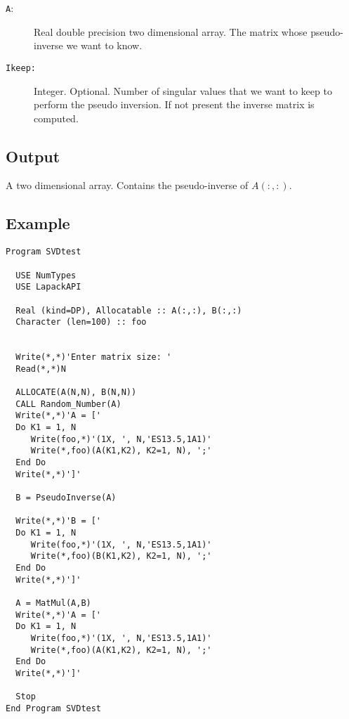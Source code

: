 \begin{description}
\item[\texttt{A}:]  Real double precision two dimensional array. The
  matrix whose pseudo-inverse we want to know.

\item[\texttt{Ikeep: }] Integer. Optional. Number of singular values
  that we want to keep to perform the pseudo inversion. If not present
  the inverse matrix is computed. 

\end{description}

\subsection{Output}

A two dimensional array. Contains the pseudo-inverse of $A(:,:)$.

\subsection{Example}

\begin{lstlisting}[emph=PseudoInverse,
                   emphstyle=\color{blue},
                   frame=trBL,
                   caption=Using lapack library to compute the inverse.,
                   label=pseudoinverse]
Program SVDtest

  USE NumTypes
  USE LapackAPI

  Real (kind=DP), Allocatable :: A(:,:), B(:,:)
  Character (len=100) :: foo
  

  Write(*,*)'Enter matrix size: '
  Read(*,*)N

  ALLOCATE(A(N,N), B(N,N))
  CALL Random_Number(A)
  Write(*,*)'A = ['
  Do K1 = 1, N
     Write(foo,*)'(1X, ', N,'ES13.5,1A1)'
     Write(*,foo)(A(K1,K2), K2=1, N), ';'
  End Do
  Write(*,*)']'

  B = PseudoInverse(A)

  Write(*,*)'B = ['
  Do K1 = 1, N
     Write(foo,*)'(1X, ', N,'ES13.5,1A1)'
     Write(*,foo)(B(K1,K2), K2=1, N), ';'
  End Do
  Write(*,*)']'

  A = MatMul(A,B)
  Write(*,*)'A = ['
  Do K1 = 1, N
     Write(foo,*)'(1X, ', N,'ES13.5,1A1)'
     Write(*,foo)(A(K1,K2), K2=1, N), ';'
  End Do
  Write(*,*)']'

  Stop
End Program SVDtest
\end{lstlisting}







